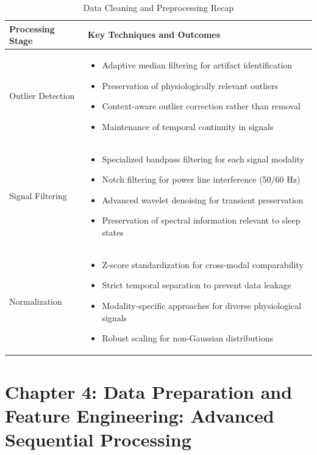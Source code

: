 \documentclass[a4paper,12pt,twoside]{article}
\begin{document}
\begin{table}[H]
\centering
\caption{Data Cleaning and Preprocessing Recap}
\begin{tabular}{|p{3cm}|p{11cm}|}
\hline
\textbf{Processing Stage} & \textbf{Key Techniques and Outcomes} \\
\hline
Outlier Detection & 
\begin{itemize}
  \item Adaptive median filtering for artifact identification
  \item Preservation of physiologically relevant outliers
  \item Context-aware outlier correction rather than removal
  \item Maintenance of temporal continuity in signals
\end{itemize} \\
\hline
Signal Filtering & 
\begin{itemize}
  \item Specialized bandpass filtering for each signal modality
  \item Notch filtering for power line interference (50/60 Hz)
  \item Advanced wavelet denoising for transient preservation
  \item Preservation of spectral information relevant to sleep states
\end{itemize} \\
\hline
Normalization & 
\begin{itemize}
  \item Z-score standardization for cross-modal comparability
  \item Strict temporal separation to prevent data leakage
  \item Modality-specific approaches for diverse physiological signals 
  \item Robust scaling for non-Gaussian distributions
\end{itemize} \\
\hline
\end{tabular}
\label{tab:preprocessing_summary}
\end{table}





\section{Chapter 4: Data Preparation and Feature Engineering: Advanced Sequential Processing}
\end{document}
